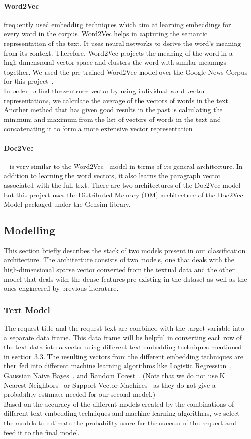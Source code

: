 \documentclass[runningheads]{llncs}
\begin{document}
\paragraph{Word2Vec} frequently used embedding techniques which aim at learning embeddings for every word in the corpus\cite{nlp_prac_book}. Word2Vec helps in capturing the semantic representation of the text. It uses neural networks to derive the word’s meaning from its context. Therefore, Word2Vec projects the meaning of the word in a high-dimensional vector space and clusters the word with similar meanings together. We used the pre-trained Word2Vec model over the Google News Corpus for this project~\cite{w2v}.\\
In order to find the sentence vector by using individual word vector representations, we calculate the average of the vectors of words in the text. Another method that has given good results in the past is calculating the minimum and maximum from the list of vectors of words in the text and concatenating it to form a more extensive vector representation~\cite{minmax}.
\paragraph{Doc2Vec}~\cite{d2v} is very similar to the Word2Vec~\cite{w2v} model in terms of its general architecture. In addition to learning the word vectors, it also learns the paragraph vector associated with the full text. There are two architectures of the Doc2Vec model but this project uses the Distributed Memory (DM) architecture of the Doc2Vec Model packaged under the Gensim library. 

\subsection{Modelling}
This section briefly describes the stack of two models present in our classification architecture. The architecture consists of two models, one that deals with the high-dimensional sparse vector converted from the textual data and the other model that deals with the dense features pre-existing in the dataset as well as the ones engineered by previous literature.
\subsubsection{Text Model}
The request title and the request text are combined with the target variable into a separate data frame. This data frame will be helpful in converting each row of the text data into a vector using different text embedding techniques mentioned in section 3.3. The resulting vectors from the different embedding techniques are then fed into different machine learning algorithms like Logistic Regression~\cite{lr}, Gaussian Naive Bayes~\cite{nb}, and Random Forest~\cite{rf}. (Note that we do not use K Nearest Neighbors~\cite{knn} or Support Vector Machines~\cite{svm} as they do not give a probability estimate needed for our second model.)\\
Based on the accuracy of the different models created by the combinations of different text embedding techniques and machine learning algorithms, we select the models to estimate the probability score for the success of the request and feed it to the final model.
\end{document}
